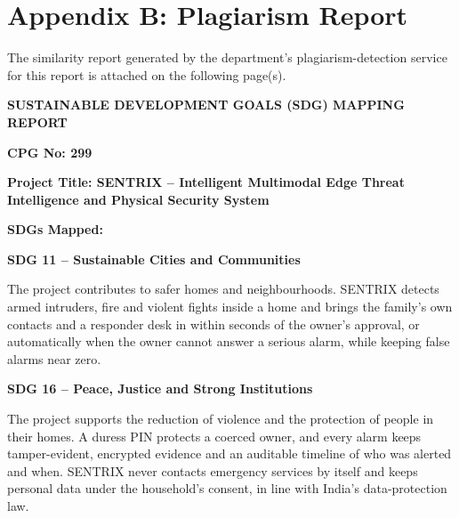 \clearpage
{}
\renewcommand{\bibname}{Appendix A: References}
\begingroup
\singlespacing\small


\endgroup

\clearpage
\chapter*{Appendix B: Plagiarism Report}
The similarity report generated by the department's plagiarism-detection service for this report is attached on the following page(s).

\vspace{12pt}
\begin{center}
\end{center}

\clearpage
\begingroup
{}
\setlength{\parskip}{7pt}
\begin{center}\textbf{\large SUSTAINABLE DEVELOPMENT GOALS (SDG) MAPPING REPORT}\end{center}

\textbf{CPG No: 299}

\textbf{Project Title: SENTRIX -- Intelligent Multimodal Edge Threat Intelligence and Physical Security System}

\textbf{SDGs Mapped:}

\textbf{SDG 11 -- Sustainable Cities and Communities}

The project contributes to safer homes and neighbourhoods. SENTRIX detects armed intruders, fire and violent fights inside a home and brings the family's own contacts and a responder desk in within seconds of the owner's approval, or automatically when the owner cannot answer a serious alarm, while keeping false alarms near zero.

\textbf{SDG 16 -- Peace, Justice and Strong Institutions}

The project supports the reduction of violence and the protection of people in their homes. A duress PIN protects a coerced owner, and every alarm keeps tamper-evident, encrypted evidence and an auditable timeline of who was alerted and when. SENTRIX never contacts emergency services by itself and keeps personal data under the household's consent, in line with India's data-protection law.

